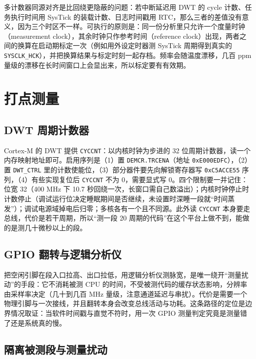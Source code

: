 \documentclass[12pt,a4paper,fontset=fandol]{ctexbook}
\newcommand{\Tp}[1]{\texttt{#1}}
\begin{document}
多计数器同源对齐是比回绕更隐蔽的问题：若中断延迟用 DWT 的 cycle 计数、任务执行时间用 SysTick 的装载计数、日志时间戳用 RTC，那么三者的差值没有意义，因为三个时区不一样。可执行的原则是：同一份分析里只允许一个度量时钟（measurement clock），其余时钟只作参考时间（reference clock）出现，两者之间的换算在启动期标定一次（例如用外设定时器测 SysTick 周期得到真实的 \Tp{SYSCLK\_HCK}），并把换算结果与标定时刻一起存档。频率会随温度漂移，几百 ppm 量级的漂移在长时间窗口上会显出来，所以标定要有有效期。

\section{打点测量}

\label{sec:ch02-probe}

\subsection{DWT 周期计数器}

Cortex-M 的 DWT 提供 \Tp{CYCCNT}：以内核时钟为步进的 32 位周期计数器，读一个内存映射地址即可。启用序列是（1）置 \Tp{DEMCR.TRCENA}（地址 \Tp{0xE000EDFC}），（2）置 \Tp{DWT\_CTRL} 里的计数使能位，（3）部分器件要先向解锁寄存器写 \Tp{0xC5ACCE55} 序列，（4）有些实现复位后 \Tp{CYCCNT} 不为 0，需要显式写 0。四个限制要一并记住：位宽 32（400 MHz 下 10.7 秒回绕一次，长窗口需自己数溢出）；内核时钟停止时计数停止（调试运行位决定睡眠期间是否继续，未设置时深睡一段就``时间蒸发''）；调试电源域掉电后归零；多核各有一个且不同源。此外读 \Tp{CYCCNT} 本身要走总线，代价是若干周期，所以``测一段 20 周期的代码''在这个平台上做不到，能做的是测几十微秒以上的段。

\subsection{GPIO 翻转与逻辑分析仪}

把空闲引脚在段入口拉高、出口拉低，用逻辑分析仪测脉宽，是唯一绕开``测量扰动''的手段：它不消耗被测 CPU 的时间，不受被测代码的缓存状态影响，分辨率由采样率决定（几十到几百 MHz 量级，注意通道延迟与串扰）。代价是需要一个物理引脚与一次接线，并且翻转本身会改变总线活动与功耗。这条路径的定位是边界情况取证：当软件时间戳与直觉不符时，用一次 GPIO 测量判定究竟是测量错了还是系统真的慢。

\subsection{隔离被测段与测量扰动}
\end{document}
